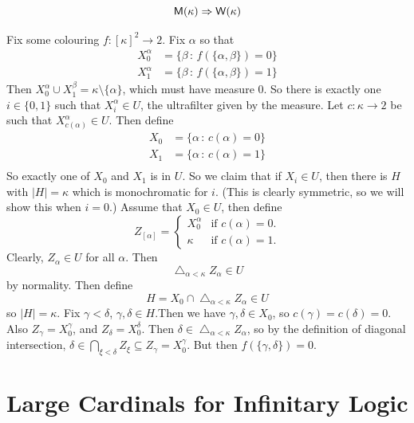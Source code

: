 \documentclass{article}
\begin{document}
\begin{fancythm}{}
    \[\mathsf{M}(\kappa) \Rightarrow \mathsf{W}(\kappa)\]
\end{fancythm}
\proof Fix some colouring $f : [\kappa]^{2} \to 2$. Fix $\alpha$ so that 
\begin{align*} 
    X_{0}^{\alpha} &= \{ \beta \, : \, f(\{\alpha,\beta\})=0\} \\
    X_{1}^{\alpha} &= \{\beta \, : \, f(\{\alpha,\beta\})=1\}
\end{align*}
Then $X_{0}^{\alpha} \cup X_{1}^{\beta} = \kappa \setminus\{\alpha\}$, which must have measure $0$. So there is exactly one $i \in \{0,1\}$ such that $X_{i}^{\alpha} \in U$, the ultrafilter given by the measure. Let $c : \kappa \to 2$ be such that $X_{c(\alpha)}^{\alpha} \in U$. Then define \begin{align*}
    X_{0} &= \{\alpha \, : \, c(\alpha)=0\}\\
    X_{1} &= \{\alpha \, : \, c(\alpha)=1\}\\
\end{align*}
So exactly one of $X_{0}$ and $X_{1}$ is in $U$.\gap 
So we claim that if $X_{i} \in U$, then there is $H$ with $|H|=\kappa$ which is monochromatic for $i$. (This is clearly symmetric, so we will show this when $i=0$.) Assume that $X_{0} \in U$, then define \[ Z_[\alpha] = \begin{cases}
    X_{0}^{\alpha} & \text{if $c(\alpha) = 0$.}\\
    \kappa & \text{if $c(\alpha)=1$.}
\end{cases}\] 
Clearly, $Z_{\alpha} \in U$ for all $\alpha$. Then \[ \bigtriangleup_{\alpha < \kappa} Z_{\alpha} \in U\] by normality. Then define \[H = X_{0} \cap \bigtriangleup_{\alpha < \kappa} Z_{\alpha} \in U\] so $|H|=\kappa$. Fix $\gamma < \delta$, $\gamma, \delta \in H$.Then we have $\gamma, \delta \in X_{0}$, so $c(\gamma)=c(\delta)=0$. Also $Z_{\gamma}=X_{0}^{\gamma}$, and $Z_{\delta}=X_{0}^{\delta}$. Then $\delta \in \bigtriangleup_{\alpha<\kappa} Z_{\alpha}$, so by the definition of diagonal intersection, $\delta \in \bigcap_{\xi < \delta} Z_{\xi} \subseteq Z_{\gamma} = X_{0}^{\gamma}$. But then $f(\{\gamma, \delta\})=0$. \endproof


\section{Large Cardinals for Infinitary Logic}
\end{document}
